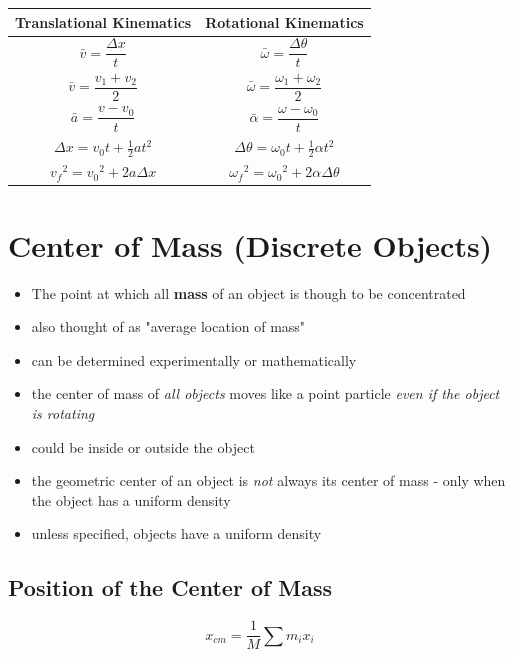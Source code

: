 \documentclass[titlepage]{article}
\begin{document}
\begin{table}[H]
    \makegapedcells
    \begin{tabular}{c|c}
        \textbf{Translational Kinematics}    & \textbf{Rotational Kinematics}                         \\
        \hline
        $\bar{v} = \dfrac{\Delta x}{t}$      & $\bar{\omega} = \dfrac{\Delta \theta}{t}$              \\
        $\bar{v} = \dfrac{v_1 + v_2}{2}$     & $\bar{\omega} = \dfrac{\omega_1 + \omega_2}{2}$        \\
        $\bar{a} = \dfrac{v - v_0}{t}$       & $\bar{\alpha} = \dfrac{\omega - \omega_0}{t}$          \\
        $\Delta x = v_0 t + \frac{1}{2}at^2$ & $\Delta \theta = \omega_0 t + \frac{1}{2} \alpha t^2$  \\
        ${v_{f}}^2 = {v_0}^2 + 2a\Delta x$   & ${\omega_{f}}^2 = {\omega_0}^2 + 2\alpha\Delta \theta$ \\
    \end{tabular}
\end{table}

\section{Center of Mass (Discrete Objects)}
\begin{itemize}
    \item The point at which all \textbf{mass} of an object is though to be concentrated
    \item also thought of as "average location of mass"
    \item can be determined experimentally or mathematically
    \item the center of mass of \emph{all objects} moves like a point particle \emph{even if the object is rotating}
    \item could be inside or outside the object
    \item the geometric center of an object is \emph{not} always its center of mass - only when the object has a uniform density
    \item unless specified, objects have a uniform density
\end{itemize}

\subsection{Position of the Center of Mass}
\[x_{cm} = \frac{1}{M}\sum m_i x_i\]
\end{document}
